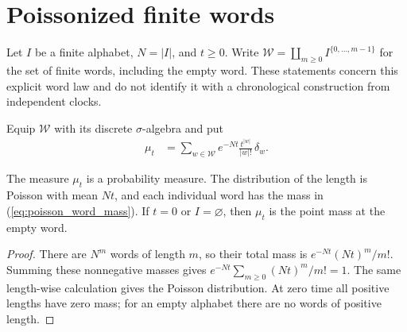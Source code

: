 \section{Poissonized finite words}
\label{sec:poisson_words}

Let $I$ be a finite alphabet, $N=|I|$, and $t\geq0$.  Write
$\mathcal W=\coprod_{m\geq0}I^{\{0,\ldots,m-1\}}$ for the set of finite
words, including the empty word.  These statements concern this explicit
word law and do not identify it with a chronological construction from
independent clocks.

\begin{definition}
\label{def:poisson_word_measure}
\leanok
Equip $\mathcal W$ with its discrete $\sigma$-algebra and put
\begin{align}
 \mu_t&=\sum_{w\in\mathcal W}
       e^{-Nt}\frac{t^{|w|}}{|w|!}\,\delta_w.
 \label{eq:poisson_word_mass}
\end{align}
\end{definition}

\begin{lemma}
\label{lem:poisson_word_normalization}
\leanok
{}
The measure $\mu_t$ is a probability measure.  The distribution of the length
is Poisson with mean $Nt$, and each individual word has the mass in
(\ref{eq:poisson_word_mass}).  If $t=0$ or $I=\varnothing$, then $\mu_t$
is the point mass at the empty word.
\end{lemma}
\begin{proof}
\leanok
There are $N^m$ words of length $m$, so their total mass is
$e^{-Nt}(Nt)^m/m!$.  Summing these nonnegative masses gives
$e^{-Nt}\sum_{m\geq0}(Nt)^m/m!=1$.  The same length-wise calculation gives
the Poisson distribution.  At zero time all positive lengths have zero mass;
for an empty alphabet there are no words of positive length.
\end{proof}

